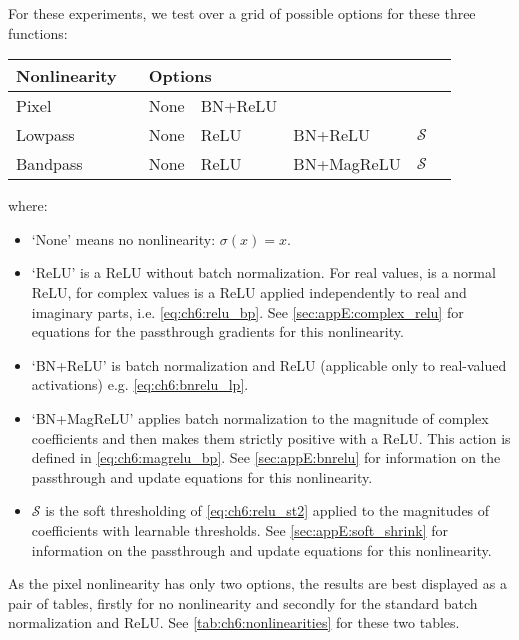 For these experiments, we test over a grid of possible options for these three
functions:
\begin{table}[h!]
  \centering
\begin{tabular}{l l l l l l l}
  \toprule
  Nonlinearity & \hphantom{abc} & \multicolumn{4}{l}{Options} \\
  \midrule
  Pixel && None & BN+ReLU \\
  Lowpass && None & ReLU & BN+ReLU & $\mathcal{S}$ \\
  Bandpass && None & ReLU & BN+MagReLU & $\mathcal{S}$ 
  \\\bottomrule
\end{tabular}
\end{table}
where:
\begin{itemize}
  \item `None' means no nonlinearity: $\sigma(x) = x$.
  \item `ReLU' is a ReLU without batch normalization. For real values, is a
    normal ReLU, for complex values is a ReLU applied independently to real and
    imaginary parts, i.e.
    \eqref{eq:ch6:relu_bp}. See \autoref{sec:appE:complex_relu} for equations
    for the passthrough gradients for this nonlinearity.
  \item `BN+ReLU' is batch normalization and ReLU (applicable only to real-valued
    activations) e.g. \eqref{eq:ch6:bnrelu_lp}.
  \item `BN+MagReLU' applies batch normalization to the magnitude of complex
    coefficients and then makes them strictly positive with a ReLU. This action
    is defined in \eqref{eq:ch6:magrelu_bp}. See \autoref{sec:appE:bnrelu} for
    information on the passthrough and update equations for this nonlinearity.
  \item $\mathcal{S}$ is the soft thresholding of \eqref{eq:ch6:relu_st2}
    applied to the magnitudes of coefficients with learnable thresholds.  See
    \autoref{sec:appE:soft_shrink} for information on the passthrough and update
    equations for this nonlinearity.
\end{itemize}



As the pixel nonlinearity has only two options, the results are best displayed as
a pair of tables, firstly for no nonlinearity and secondly for the
standard batch normalization and ReLU. See
\autoref{tab:ch6:nonlinearities} for these two tables. 

